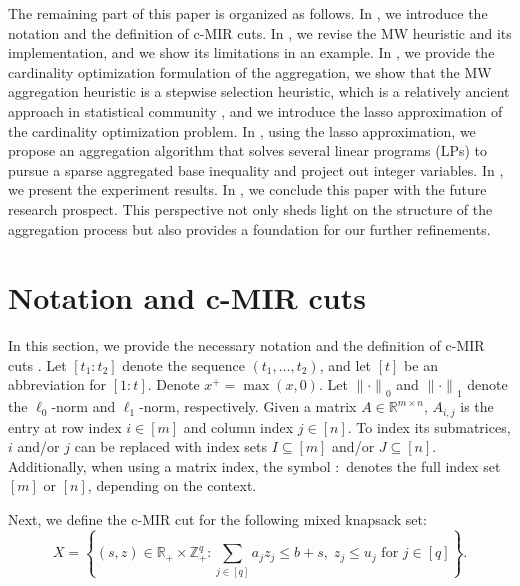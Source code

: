 \documentclass[a4paper,UKenglish,cleveref, autoref,  thm-restate]{lipics-v2021}
\newcommand{\bR}{\mathbb{R}}
\newcommand{\bZ}{\mathbb{Z}}
\newcommand{\norm}[1]{{\lVert#1\rVert}}
\begin{document}
	
	The remaining part of this paper is organized as follows. In , we introduce the notation and the definition of c-MIR cuts. In , we revise the MW heuristic and its implementation, and we show its limitations in an example. In , we provide the cardinality optimization formulation of the aggregation,  we show that the MW aggregation heuristic is a stepwise selection heuristic, which is a relatively ancient approach in statistical community  \cite{draper1998applied,hastie2017extended}, and we introduce the lasso approximation of the cardinality optimization problem. In , using the lasso approximation, we propose an aggregation algorithm that solves several linear programs (LPs) to pursue a sparse aggregated base inequality and project out integer variables. In , we present the experiment results. In , we conclude this paper with the future research prospect. This perspective not only sheds light on the structure of the aggregation process but also provides a foundation for our further refinements.
	
	
	\section{Notation and c-MIR cuts}\label{sec.notation}
	In this section, we provide the necessary notation and the definition of c-MIR cuts \cite{marchand2001aggregation}.
	Let $[t_1:t_2]$ denote the sequence $(t_1,\dots, t_2)$, and let $[t]$ be an abbreviation for $[1:t]$.
	Denote $x^+ = \max(x, 0)$. Let $\norm{\cdot}_0$ and $\norm{\cdot}_1$ denote the $\ell_0$-norm and $\ell_1$-norm, respectively. Given a matrix $A \in \bR^{m \times n}$, $A_{i,j}$ is the entry at row index $i \in [m]$ and column index $j \in [n]$. To index its submatrices, $i$ and/or $j$ can be replaced with index sets $I \subseteq [m]$ and/or $J \subseteq [n]$. Additionally, when using a matrix index, the symbol $:$ denotes the full index set $[m]$ or $[n]$, depending on the context.
	
	
	
	
	Next, we define the c-MIR cut for the following mixed knapsack set:
	\begin{equation}
		\label{eq.mks}
		X = \left\{ (s,z) \in \bR_+ \times \bZ_+^q : \sum_{j \in [q]} a_j z_j \leq b + s, \; z_j \leq u_j \text{ for } j \in [q] \right\}.
	\end{equation}%
	
\end{document}
